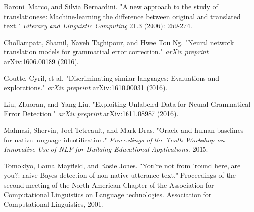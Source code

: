 \documentclass{article} %
\begin{document}
\begin{thebibliography}{6}

    Baroni, Marco, and Silvia Bernardini.
    "A new approach to the study of translationese: Machine-learning the difference
    between original and translated text."
    \emph{Literary and Linguistic Computing} 21.3 (2006): 259-274.

    Chollampatt, Shamil, Kaveh Taghipour, and Hwee Tou Ng.
    "Neural network translation models for grammatical error correction."
    \emph{arXiv preprint} arXiv:1606.00189 (2016).

    Goutte, Cyril, et al.
    "Discriminating similar languages: Evaluations and explorations."
    \emph{arXiv preprint} arXiv:1610.00031 (2016).

    Liu, Zhuoran, and Yang Liu.
    "Exploiting Unlabeled Data for Neural Grammatical Error Detection."
    \emph{arXiv preprint} arXiv:1611.08987 (2016).

    Malmasi, Shervin, Joel Tetreault, and Mark Dras.
    "Oracle and human baselines for native language identification."
    \emph{Proceedings of the Tenth Workshop on Innovative Use of NLP for Building
    Educational Applications.} 2015.

    Tomokiyo, Laura Mayfield, and Rosie Jones.
    "You're not from 'round here, are you?: naive Bayes detection of non-native utterance text."
    {Proceedings of the second meeting of the North American Chapter of the Association
    for Computational Linguistics on Language technologies.} Association for Computational Linguistics, 2001.

\end{thebibliography}
\end{document}
